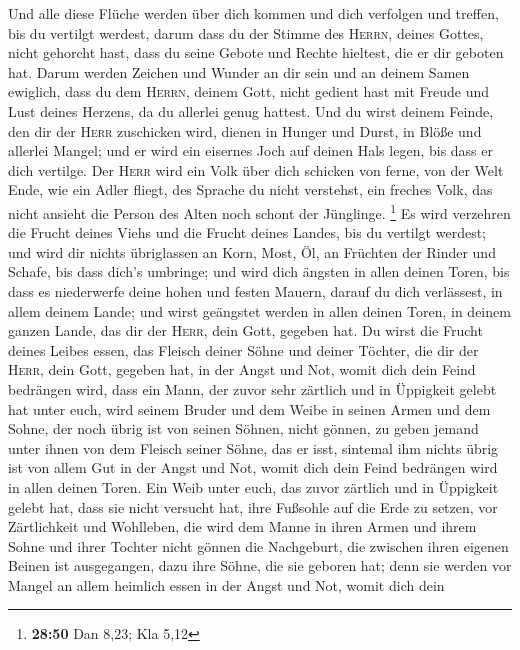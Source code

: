  Und alle diese Flüche werden über dich kommen und dich
verfolgen und treffen, bis du vertilgt werdest, darum dass du der Stimme
des \textsc{Herrn}, deines Gottes, nicht gehorcht hast, dass du seine
Gebote und Rechte hieltest, die er dir geboten hat. 
Darum werden Zeichen und Wunder an dir sein und an deinem Samen
ewiglich,  dass du dem \textsc{Herrn}, deinem Gott, nicht
gedient hast mit Freude und Lust deines Herzens, da du allerlei genug
hattest.  Und du wirst deinem Feinde, den dir der
\textsc{Herr} zuschicken wird, dienen in Hunger und Durst, in Blöße und
allerlei Mangel; und er wird ein eisernes Joch auf deinen Hals legen,
bis dass er dich vertilge.  Der \textsc{Herr} wird ein
Volk über dich schicken von ferne, von der Welt Ende, wie ein Adler
fliegt, des Sprache du nicht verstehst,  ein freches
Volk, das nicht ansieht die Person des Alten noch schont der Jünglinge.
\footnote{\textbf{28:50} Dan 8,23; Kla 5,12}  Es wird
verzehren die Frucht deines Viehs und die Frucht deines Landes, bis du
vertilgt werdest; und wird dir nichts übriglassen an Korn, Most, Öl, an
Früchten der Rinder und Schafe, bis dass dich's umbringe;
 und wird dich ängsten in allen deinen Toren, bis dass es
niederwerfe deine hohen und festen Mauern, darauf du dich verlässest, in
allem deinem Lande; und wirst geängstet werden in allen deinen Toren, in
deinem ganzen Lande, das dir der \textsc{Herr}, dein Gott, gegeben hat.
 Du wirst die Frucht deines Leibes essen, das Fleisch
deiner Söhne und deiner Töchter, die dir der \textsc{Herr}, dein Gott,
gegeben hat, in der Angst und Not, womit dich dein Feind bedrängen wird,
 dass ein Mann, der zuvor sehr zärtlich und in Üppigkeit
gelebt hat unter euch, wird seinem Bruder und dem Weibe in seinen Armen
und dem Sohne, der noch übrig ist von seinen Söhnen, nicht gönnen,
 zu geben jemand unter ihnen von dem Fleisch seiner
Söhne, das er isst, sintemal ihm nichts übrig ist von allem Gut in der
Angst und Not, womit dich dein Feind bedrängen wird in allen deinen
Toren.  Ein Weib unter euch, das zuvor zärtlich und in
Üppigkeit gelebt hat, dass sie nicht versucht hat, ihre Fußsohle auf die
Erde zu setzen, vor Zärtlichkeit und Wohlleben, die wird dem Manne in
ihren Armen und ihrem Sohne und ihrer Tochter nicht gönnen
 die Nachgeburt, die zwischen ihren eigenen Beinen ist
ausgegangen, dazu ihre Söhne, die sie geboren hat; denn sie werden vor
Mangel an allem heimlich essen in der Angst und Not, womit dich dein

